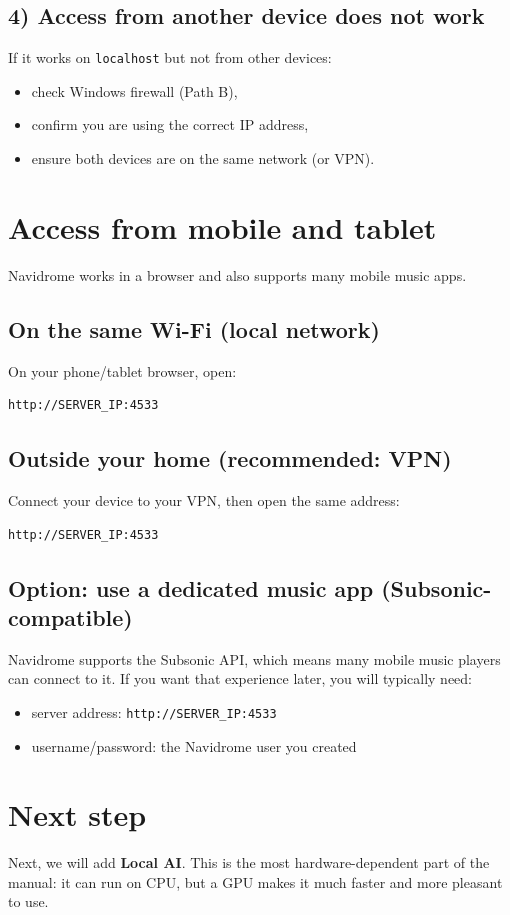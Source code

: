 \subsection{4) Access from another device does not work}
If it works on \texttt{localhost} but not from other devices:
\begin{itemize}[leftmargin=*]
  \item check Windows firewall (Path B),
  \item confirm you are using the correct IP address,
  \item ensure both devices are on the same network (or VPN).
\end{itemize}

\section{Access from mobile and tablet}
Navidrome works in a browser and also supports many mobile music apps.

\subsection*{On the same Wi-Fi (local network)}
On your phone/tablet browser, open:

\begin{lstlisting}
http://SERVER_IP:4533
\end{lstlisting}

\subsection*{Outside your home (recommended: VPN)}
Connect your device to your VPN, then open the same address:

\begin{lstlisting}
http://SERVER_IP:4533
\end{lstlisting}

\subsection*{Option: use a dedicated music app (Subsonic-compatible)}
Navidrome supports the Subsonic API, which means many mobile music players can connect to it.
If you want that experience later, you will typically need:
\begin{itemize}[leftmargin=*]
  \item server address: \texttt{http://SERVER\_IP:4533}
  \item username/password: the Navidrome user you created
\end{itemize}



\section{Next step}
Next, we will add \textbf{Local AI}. This is the most hardware-dependent part of the manual:
it can run on CPU, but a GPU makes it much faster and more pleasant to use. 